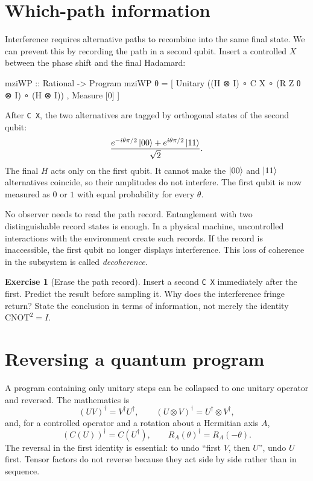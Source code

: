 \documentclass[11pt,a4paper]{article}
\theoremstyle{definition}
\newtheorem{exercise}{Exercise}[section]
\begin{document}
\noindent\begin{minipage}{\textwidth}
\section{Which-path information}
\label{sec:whichpath}

Interference requires alternative paths to recombine into the same final
state.  We can prevent this by recording the path in a second qubit.  Insert
a controlled $X$ between the phase shift and the final Hadamard:
\begin{qppcode}
mziWP :: Rational -> Program
mziWP θ =
  [ Unitary ((H ⊗ I) ∘ C X ∘ (R Z θ ⊗ I) ∘ (H ⊗ I))
  , Measure [0]
  ]
\end{qppcode}
\end{minipage}
After \lstinline|C X|, the two alternatives are tagged by orthogonal states
of the second qubit:
\[
  \frac{e^{-i\theta\pi/2}\left| 00 \right\rangle
        +e^{i\theta\pi/2}\left| 11 \right\rangle}{\sqrt2}.
\]
The final $H$ acts only on the first qubit.  It cannot make the $\left| 00 \right\rangle$
and $\left| 11 \right\rangle$ alternatives coincide, so their amplitudes do not interfere.
The first qubit is now measured as $0$ or $1$ with equal probability for
every $\theta$.

No observer needs to read the path record.  Entanglement with two
distinguishable record states is enough.  In a physical machine, uncontrolled
interactions with the environment create such records.  If the record is
inaccessible, the first qubit no longer displays interference.  This loss of
coherence in the subsystem is called \emph{decoherence}.

\begin{exercise}[Erase the path record]
Insert a second \lstinline|C X| immediately after the first.  Predict the
result before sampling it.  Why does the interference fringe return?  State
the conclusion in terms of information, not merely the identity
$\mathrm{CNOT}^2=I$.
\end{exercise}

\section{Reversing a quantum program}
\label{sec:reversal}

A program containing only unitary steps can be collapsed to one unitary
operator and reversed.  The mathematics is
\[
  (UV)^\dagger=V^\dagger U^\dagger,
  \qquad
  (U\otimes V)^\dagger=U^\dagger\otimes V^\dagger,
\]
and, for a controlled operator and a rotation about a Hermitian axis $A$,
\[
  (C(U))^\dagger=C(U^\dagger),\qquad
  R_A(\theta)^\dagger=R_A(-\theta).
\]
The reversal in the first identity is essential: to undo ``first $V$, then
$U$'', undo $U$ first.  Tensor factors do not reverse because they act side
by side rather than in sequence.
\end{document}
